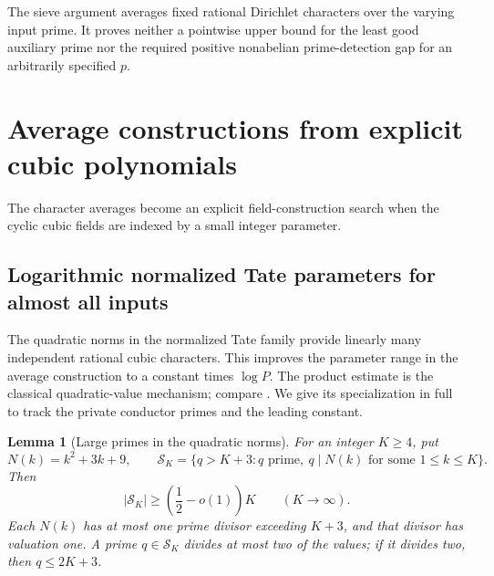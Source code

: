 \documentclass[11pt]{article}
\newtheorem{lemma}[theorem]{Lemma}
\theoremstyle{definition}
\theoremstyle{remark}
\begin{document}
The sieve argument averages fixed rational Dirichlet characters over
the varying input prime.  It proves neither a pointwise upper bound
for the least good auxiliary prime nor the required positive
nonabelian prime-detection gap for an arbitrarily specified $p$.

\section{Average constructions from explicit cubic polynomials}
\label{sec:cubic-average-results}
The character averages become an explicit field-construction search when the cyclic cubic fields are indexed by a small integer parameter.

\subsection{Logarithmic normalized Tate parameters for almost all inputs}

The quadratic norms in the normalized Tate family provide linearly many
independent rational cubic characters.  This improves the parameter
range in the average construction to a constant times $\log P$.
The product estimate is the classical quadratic-value mechanism;
compare \citet[Lemmas~1, 3, and 4 and \S2.4, pp.~1131--1134]{Cilleruelo2011}.
We give its specialization in full to track the private conductor
primes and the leading constant.  

\begin{lemma}[Large primes in the quadratic norms]
\label{lem:tate-large-prime-norms}
For an integer $K\ge4$, put
\[
 N(k)=k^2+3k+9,\qquad
 \mathcal S_K=\{q>K+3:q\text{ prime},\ q\mid N(k)
                      \text{ for some }1\le k\le K\}.
\]
Then
\begin{equation}\label{eq:tate-large-prime-count}
 |\mathcal S_K|\ge\left(\frac12-o(1)\right)K
 \qquad(K\longrightarrow\infty).
\end{equation}
Each $N(k)$ has at most one prime divisor exceeding $K+3$, and
that divisor has valuation one.  A prime $q\in\mathcal S_K$
divides at most two of the values; if it divides two, then
$q\le2K+3$.
\end{lemma}
\end{document}
